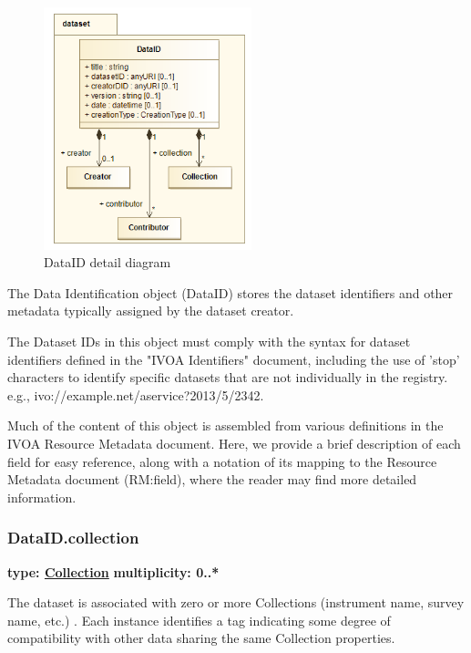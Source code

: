   \begin{figure}[h]
  \begin{center}
    \includegraphics[width=2.375in]{diagrams/DataID.png}
    \caption{ DataID detail diagram}\label{fig:dataid}
  \end{center}
  \end{figure}

  The Data Identification object (DataID) stores the dataset identifiers and
  other metadata typically assigned by the dataset creator.
  
  The Dataset IDs in this object must comply with the syntax for dataset
  identifiers defined in the "IVOA Identifiers" \citep{2007ivoa.spec.0314P} document, including
  the use of 'stop' characters to identify specific datasets that are
  not individually in the registry. e.g., ivo://example.net/aservice?2013/5/2342.
  
  Much of the content of this object is assembled from various definitions in
  the IVOA Resource Metadata document. Here, we provide a brief description
  of each field for easy reference, along with a notation of its mapping to
  the Resource Metadata document (RM:field), where the reader may find more
  detailed information.

  \subsubsection{DataID.collection}
  \textbf{type: \hyperref[sect:collection]{Collection}} \newline
  \textbf{multiplicity: 0..*} \newline
  
  The dataset is associated with zero or more Collections (instrument name,
  survey name, etc.) . Each instance identifies a tag indicating some degree of
  compatibility with other data sharing the same Collection properties.
  
